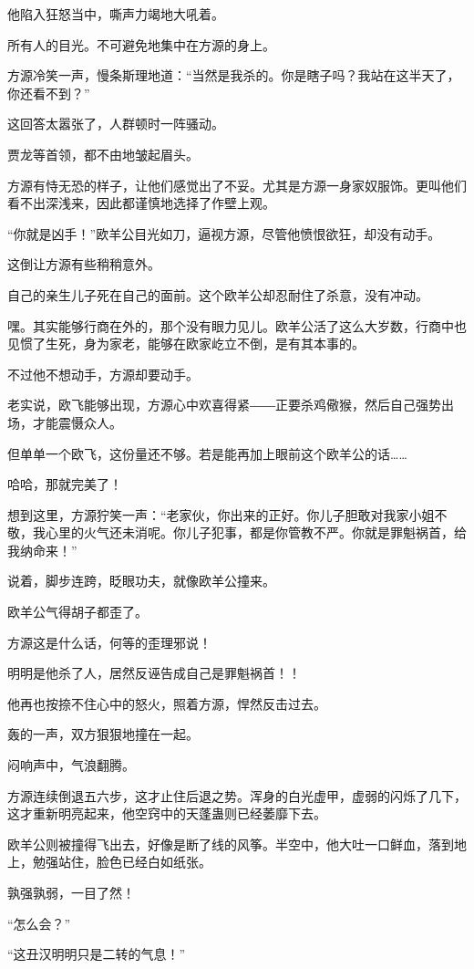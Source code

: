\begin{this_body}
他陷入狂怒当中，嘶声力竭地大吼着。

所有人的目光。不可避免地集中在方源的身上。

方源冷笑一声，慢条斯理地道：“当然是我杀的。你是瞎子吗？我站在这半天了，你还看不到？”

这回答太嚣张了，人群顿时一阵骚动。

贾龙等首领，都不由地皱起眉头。

方源有恃无恐的样子，让他们感觉出了不妥。尤其是方源一身家奴服饰。更叫他们看不出深浅来，因此都谨慎地选择了作壁上观。

“你就是凶手！”欧羊公目光如刀，逼视方源，尽管他愤恨欲狂，却没有动手。

这倒让方源有些稍稍意外。

自己的亲生儿子死在自己的面前。这个欧羊公却忍耐住了杀意，没有冲动。

嘿。其实能够行商在外的，那个没有眼力见儿。欧羊公活了这么大岁数，行商中也见惯了生死，身为家老，能够在欧家屹立不倒，是有其本事的。

不过他不想动手，方源却要动手。

老实说，欧飞能够出现，方源心中欢喜得紧――正要杀鸡儆猴，然后自己强势出场，才能震慑众人。

但单单一个欧飞，这份量还不够。若是能再加上眼前这个欧羊公的话……

哈哈，那就完美了！

想到这里，方源狞笑一声：“老家伙，你出来的正好。你儿子胆敢对我家小姐不敬，我心里的火气还未消呢。你儿子犯事，都是你管教不严。你就是罪魁祸首，给我纳命来！”

说着，脚步连跨，眨眼功夫，就像欧羊公撞来。

欧羊公气得胡子都歪了。

方源这是什么话，何等的歪理邪说！

明明是他杀了人，居然反诬告成自己是罪魁祸首！！

他再也按捺不住心中的怒火，照着方源，悍然反击过去。

轰的一声，双方狠狠地撞在一起。

闷响声中，气浪翻腾。

方源连续倒退五六步，这才止住后退之势。浑身的白光虚甲，虚弱的闪烁了几下，这才重新明亮起来，他空窍中的天蓬蛊则已经萎靡下去。

欧羊公则被撞得飞出去，好像是断了线的风筝。半空中，他大吐一口鲜血，落到地上，勉强站住，脸色已经白如纸张。

孰强孰弱，一目了然！

“怎么会？”

“这丑汉明明只是二转的气息！”


\end{this_body}
